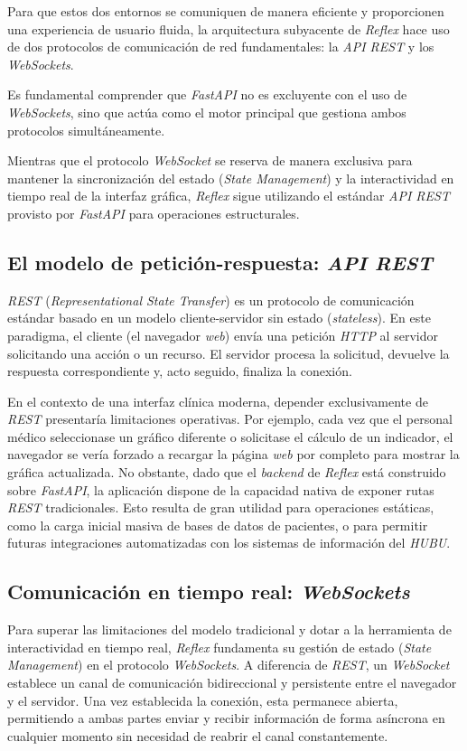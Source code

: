 Para que estos dos entornos se comuniquen de manera eficiente y proporcionen una experiencia de usuario fluida, la arquitectura subyacente de \textit{Reflex} hace uso de dos protocolos de comunicación de red fundamentales: la \textit{API REST} y los \textit{WebSockets}.

Es fundamental comprender que \textit{FastAPI} no es excluyente con el uso de \textit{WebSockets}, sino que actúa como el motor principal que gestiona ambos protocolos simultáneamente. 

Mientras que el protocolo \textit{WebSocket} se reserva de manera exclusiva para mantener la sincronización del estado (\textit{State Management}) y la interactividad en tiempo real de la interfaz gráfica, \textit{Reflex} sigue utilizando el estándar \textit{API REST} provisto por \textit{FastAPI} para operaciones estructurales.

\subsection{El modelo de petición-respuesta: \textit{API REST}}
\textit{REST} (\textit{Representational State Transfer}) es un protocolo de comunicación estándar basado en un modelo cliente-servidor sin estado (\textit{stateless}). En este paradigma, el cliente (el navegador \textit{web}) envía una petición \textit{HTTP} al servidor solicitando una acción o un recurso. El servidor procesa la solicitud, devuelve la respuesta correspondiente y, acto seguido, finaliza la conexión.

En el contexto de una interfaz clínica moderna, depender exclusivamente de \textit{REST} presentaría limitaciones operativas. Por ejemplo, cada vez que el personal médico seleccionase un gráfico diferente o solicitase el cálculo de un indicador, el navegador se vería forzado a recargar la página \textit{web} por completo para mostrar la gráfica actualizada. No obstante, dado que el \textit{backend} de \textit{Reflex} está construido sobre \textit{FastAPI}, la aplicación dispone de la capacidad nativa de exponer rutas \textit{REST} tradicionales. Esto resulta de gran utilidad para operaciones estáticas, como la carga inicial masiva de bases de datos de pacientes, o para permitir futuras integraciones automatizadas con los sistemas de información del \textit{HUBU}. \cite{api}

\subsection{Comunicación en tiempo real: \textit{WebSockets}}
Para superar las limitaciones del modelo tradicional y dotar a la herramienta de interactividad en tiempo real, \textit{Reflex} fundamenta su gestión de estado (\textit{State Management}) en el protocolo \textit{WebSockets}. A diferencia de \textit{REST}, un \textit{WebSocket} establece un canal de comunicación bidireccional y persistente entre el navegador y el servidor. Una vez establecida la conexión, esta permanece abierta, permitiendo a ambas partes enviar y recibir información de forma asíncrona en cualquier momento sin necesidad de reabrir el canal constantemente.

